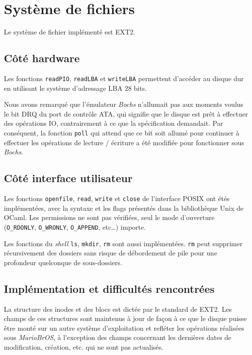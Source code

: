 \documentclass[a4paper, 10pt, french]{article}
\newcommand{\foreign}[1]{\emph{#1}}
\newcommand{\mariobros}{\foreign{MarioBrOS}}
\begin{document}
\clearpage
\section{Système de fichiers}

	Le système de fichier implémenté est EXT2.
	
	\subsection{Côté hardware}
	
		Les fonctions \verb|readPIO|, \verb|readLBA| et \verb|writeLBA| 
permettent d'accéder au disque dur en utilisant le système d'adressage LBA 28 
bits.
		
		Nous avons remarqué que l'émulateur \foreign{Bochs} n'allumait 
pas aux moments voulus le bit DRQ du port de contrôle ATA, qui signifie que le 
disque est prêt à effectuer des opérations IO, contrairement à ce que la 
spécification demandait. Par conséquent, la fonction \verb|poll| qui attend que 
ce bit soit allumé pour continuer à effectuer les opérations de lecture / 
écriture a été modifiée pour fonctionner sous \foreign{Bochs}.
	
	\subsection{Côté interface utilisateur}
	
		Les fonctions \verb|openfile|, \verb|read|, \verb|write| et 
\verb|close| de l'interface POSIX ont étés implémentées, avec la syntaxe et les 
flags présentés dans la bibliothèque Unix de OCaml. Les permissions ne sont pas 
vérifiées, seul le mode d'ouverture (\verb|O_RDONLY|, \verb|O_WRONLY|, 
\verb|O_APPEND|, etc\ldots) importe.
		
		Les fonctions du \foreign{shell} \verb|ls|, \verb|mkdir|, 
\verb|rm| sont aussi implémentées. \verb|rm| peut supprimer récursivement des 
dossiers sans risque de débordement de pile pour une profondeur quelconque de 
sous-dossiers.
		
	\subsection{Implémentation et difficultés rencontrées}
	
		La structure des inodes et des blocs est dictée par le standard 
de EXT2. Les champs de ces structures sont maintenus à jour de façon à ce que le 
disque puisse être monté sur un autre système d'exploitation et refléter les 
opérations réalisées sous \mariobros, à l'exception des champs concernant les 
dernières dates de modification, création, etc. qui ne sont pas actualisés.
		
\end{document}
